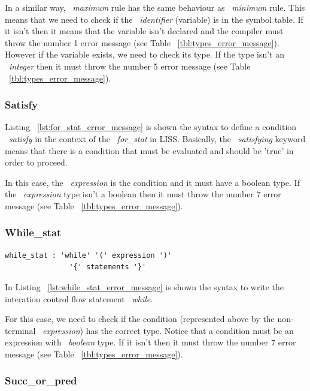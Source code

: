 \documentclass[
  oneside,
  11pt, a4paper,
  footinclude=true,
  headinclude=true,
  cleardoublepage=empty
]{scrbook}
\begin{document}
In a similar way, ~\textit{maximum} rule has the same behaviour as ~\textit{minimum} rule. This means that we need to check if the ~\textit{identifier} (variable) is in the symbol table. If it isn't then it means that the variable isn't declared and the compiler must throw the number 1 error message (see Table ~\ref{tbl:types_error_message}). However if the variable exists, we need to check its type. If the type isn't an ~\textit{integer} then it must throw the number 5 error message (see Table ~\ref{tbl:types_error_message}).

\subsubsection{Satisfy}

Listing ~\ref{lst:for_stat_error_message} is shown the syntax to define a condition ~\textit{satisfy} in the context of the ~\textit{for\_stat} in LISS.
Basically, the ~\textit{satisfying} keyword means that there is a condition that must be evaluated and should be 'true' in order to proceed.

In this case, the ~\textit{expression} is the condition and it must have a boolean type. If the ~\textit{expression} type isn't a boolean then it must throw  the number 7 error message (see Table ~\ref{tbl:types_error_message}).

\subsubsection{While\_stat}

\begin{lstlisting}[caption={While\_stat rule in LISS},label={lst:while_stat_error_message}]
  while_stat : 'while' '(' expression ')' 
               '{' statements '}'
\end{lstlisting}

In Listing ~\ref{lst:while_stat_error_message} is shown the syntax to write the interation control flow statement ~\textit{while}.

For this case, we need to check if the condition (represented above by the non-terminal ~\textit{expression}) has the correct type. Notice that a condition must be an expression with ~\textit{boolean} type. If it isn't then it must throw the number 7 error message (see Table ~\ref{tbl:types_error_message}).

\subsubsection{Succ\_or\_pred}
\end{document}
